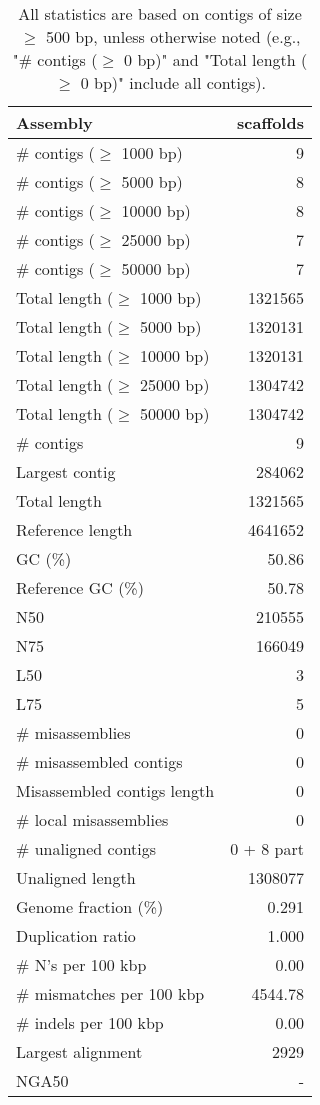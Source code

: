 \documentclass[12pt,a4paper]{article}
\begin{document}
\begin{table}[ht]
\begin{center}
\caption{All statistics are based on contigs of size $\geq$ 500 bp, unless otherwise noted (e.g., "\# contigs ($\geq$ 0 bp)" and "Total length ($\geq$ 0 bp)" include all contigs).}
\begin{tabular}{|l*{1}{|r}|}
\hline
Assembly & scaffolds \\ \hline
\# contigs ($\geq$ 1000 bp) & 9 \\ \hline
\# contigs ($\geq$ 5000 bp) & 8 \\ \hline
\# contigs ($\geq$ 10000 bp) & 8 \\ \hline
\# contigs ($\geq$ 25000 bp) & 7 \\ \hline
\# contigs ($\geq$ 50000 bp) & 7 \\ \hline
Total length ($\geq$ 1000 bp) & 1321565 \\ \hline
Total length ($\geq$ 5000 bp) & 1320131 \\ \hline
Total length ($\geq$ 10000 bp) & 1320131 \\ \hline
Total length ($\geq$ 25000 bp) & 1304742 \\ \hline
Total length ($\geq$ 50000 bp) & 1304742 \\ \hline
\# contigs & 9 \\ \hline
Largest contig & 284062 \\ \hline
Total length & 1321565 \\ \hline
Reference length & 4641652 \\ \hline
GC (\%) & 50.86 \\ \hline
Reference GC (\%) & 50.78 \\ \hline
N50 & 210555 \\ \hline
N75 & 166049 \\ \hline
L50 & 3 \\ \hline
L75 & 5 \\ \hline
\# misassemblies & 0 \\ \hline
\# misassembled contigs & 0 \\ \hline
Misassembled contigs length & 0 \\ \hline
\# local misassemblies & 0 \\ \hline
\# unaligned contigs & 0 + 8 part \\ \hline
Unaligned length & 1308077 \\ \hline
Genome fraction (\%) & 0.291 \\ \hline
Duplication ratio & 1.000 \\ \hline
\# N's per 100 kbp & 0.00 \\ \hline
\# mismatches per 100 kbp & 4544.78 \\ \hline
\# indels per 100 kbp & 0.00 \\ \hline
Largest alignment & 2929 \\ \hline
NGA50 & - \\ \hline
\end{tabular}
\end{center}
\end{table}
\end{document}
